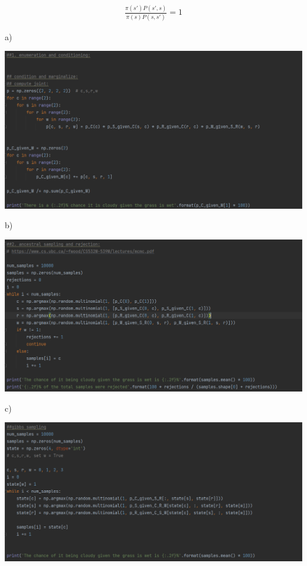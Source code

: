 \documentclass[10pt]{homeworg}
\begin{document}
\begin{align*}
\frac{\pi(s')P(s',s)}{\pi(s)P(s,s')} = 1
\end{align*}




\exercise
a)
\begin{center}
\includegraphics[scale=0.7]{figures/q3_a.PNG}
\end{center}


b)
\begin{center}
\includegraphics[scale=0.7]{figures/q3_b.PNG}
\end{center}


c)
\begin{center}
\includegraphics[scale=0.7]{figures/q3_c.PNG}
\end{center}
\end{document}
